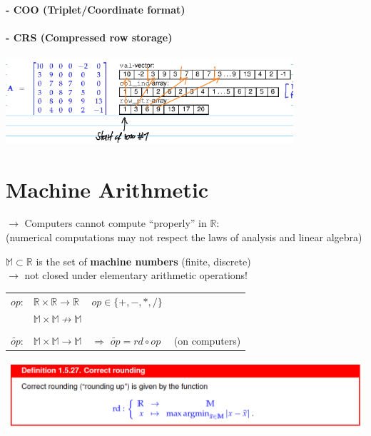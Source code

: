 \documentclass[12pt, a4paper]{article}
\newcommand{\R}{\mathbb{R}}
\newcommand{\M}{\mathbb{M}}
\begin{document}
\paragraph{- COO (Triplet/Coordinate format)}
\paragraph{- CRS (Compressed row storage)}
\hspace{2mm}

\includegraphics[width=0.8\textwidth]{SparseMatrix_CRS.png}




\newpage
\section{Machine Arithmetic}

$\rightarrow$ Computers cannot compute “properly” in $\R$: \\
(numerical computations may not respect the laws of analysis and linear algebra)\newline

$\M \subset \R$ is the set of \textbf{machine numbers} (finite, discrete) \\
$\rightarrow$ not closed under elementary arithmetic operations! \\

\begin{tabular}{lll}
	$op$: 	& 		$\R \times \R \rightarrow \R$ & 			$op \in \lbrace +, -, *, / \rbrace$	\\
			& 		$\M \times \M \not\rightarrow \M$  											\\
																								\\
	$\widetilde{op}$: &  		$\M \times \M \rightarrow \M$ 	& $\Rightarrow$ $\widetilde{op} = rd \circ op \quad $ (on computers) 
\end{tabular}

\begin{center}
	\includegraphics[width=1.0\textwidth]{rounding_function.png}
\end{center}
\end{document}
